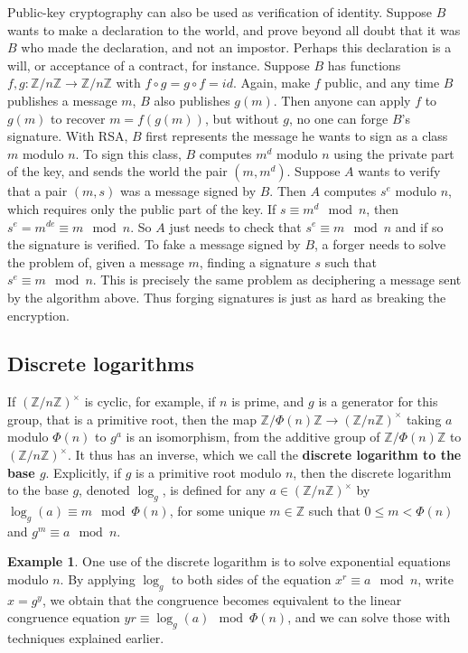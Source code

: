 \documentclass{article}
\newcommand{\Z}{\mathbb{Z}}
\newcommand{\rb}[1]{\left( #1 \right)}
\newcommand{\unit}[1]{\rb{\Z / #1\Z}^\times}
\theoremstyle{definition}\newtheorem{definition}{Definition}
\theoremstyle{definition}\newtheorem{remark}[definition]{Remark}
\theoremstyle{definition}\newtheorem*{example}{Example}
\theoremstyle{definition}\newtheorem*{note}{Note}
\begin{document}
Public-key cryptography can also be used as verification of identity. Suppose $ B $ wants to make a declaration to the world, and prove beyond all doubt that it was $ B $ who made the declaration, and not an impostor. Perhaps this declaration is a will, or acceptance of a contract, for instance. Suppose $ B $ has functions $ f, g : \Z / n\Z \to \Z / n\Z $ with $ f \circ g = g \circ f = id $. Again, make $ f $ public, and any time $ B $ publishes a message $ m $, $ B $ also publishes $ g\rb{m} $. Then anyone can apply $ f $ to $ g\rb{m} $ to recover $ m = f\rb{g\rb{m}} $, but without $ g $, no one can forge $ B $'s signature. With RSA, $ B $ first represents the message he wants to sign as a class $ m $ modulo $ n $. To sign this class, $ B $ computes $ m^d $ modulo $ n $ using the private part of the key, and sends the world the pair $ \rb{m, m^d} $. Suppose $ A $ wants to verify that a pair $ \rb{m, s} $ was a message signed by $ B $. Then $ A $ computes $ s^e $ modulo $ n $, which requires only the public part of the key. If $ s \equiv m^d \mod n $, then $ s^e = m^{de} \equiv m \mod n $. So $ A $ just needs to check that $ s^e \equiv m \mod n $ and if so the signature is verified. To fake a message signed by $ B $, a forger needs to solve the problem of, given a message $ m $, finding a signature $ s $ such that $ s^e \equiv m \mod n $. This is precisely the same problem as deciphering a message sent by the algorithm above. Thus forging signatures is just as hard as breaking the encryption.

\subsection{Discrete logarithms}

If $ \unit{n} $ is cyclic, for example, if $ n $ is prime, and $ g $ is a generator for this group, that is a primitive root, then the map $ \Z / \Phi\rb{n}\Z \to \unit{n} $ taking $ a $ modulo $ \Phi\rb{n} $ to $ g^a $ is an isomorphism, from the additive group of $ \Z / \Phi\rb{n}\Z $ to $ \unit{n} $. It thus has an inverse, which we call the \textbf{discrete logarithm to the base $ g $}. Explicitly, if $ g $ is a primitive root modulo $ n $, then the discrete logarithm to the base $ g $, denoted $ \log_g $, is defined for any $ a \in \unit{n} $ by $ \log_g\rb{a} \equiv m \mod \Phi\rb{n} $, for some unique $ m \in \Z $ such that $ 0 \le m < \Phi\rb{n} $ and $ g^m \equiv a \mod n $.

\begin{example}
One use of the discrete logarithm is to solve exponential equations modulo $ n $. By applying $ \log_g $ to both sides of the equation $ x^r \equiv a \mod n $, write $ x = g^y $, we obtain that the congruence becomes equivalent to the linear congruence equation $ yr \equiv \log_g\rb{a} \mod \Phi\rb{n} $, and we can solve those with techniques explained earlier.
\end{example}
\end{document}
